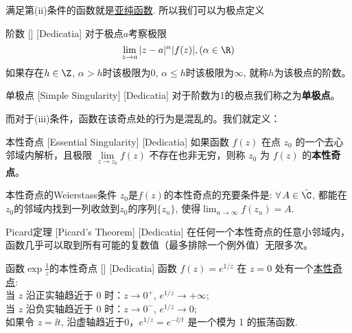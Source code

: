 \documentclass[UTF8]{ctexart}
\newcommand{\MeromorphicFunction}{\hyperref[dfn:MeromorphicFunction]{亚纯函数}}
\newcommand{\EssentialSingularity}{\hyperref[dfn:EssentialSingularity]{本性奇点}}
\begin{document}
满足第(ii)条件的函数就是\MeromorphicFunction. 所以我们可以为极点定义
\begin{dfn}
    [UUID]
    {阶数}
    []
    [Dedicatia]
    对于极点$a$考察极限
    \[\lim_{z\to a}|z-a|^\alpha |f(z)|, (\alpha\in\R)\]
    如果存在$h\in\Z$, $\alpha>h$时该极限为0, $\alpha\leq h$时该极限为$\infty$, 就称$h$为该极点的阶数。
\end{dfn}
\begin{dfn}
    [SimpleSingularity]
    {单极点}
    [Simple Singularity]
    [Dedicatia]
    对于阶数为1的极点我们称之为\textbf{单极点}。
\end{dfn}
而对于(iii)条件，函数在该奇点处的行为是混乱的。我们就定义：
\begin{dfn}
    [EssentialSingularity]
    {本性奇点}
    [Essential Singularity]
    [Dedicatia]
    如果函数 \( f(z) \) 在点 \( z_0 \) 的一个去心邻域内解析，且极限 \( \lim\limits_{z \to z_0} f(z) \) 不存在也非无穷，则称 \( z_0 \) 为 \( f(z) \) 的\textbf{本性奇点}。
\end{dfn}
\begin{thm}
    {本性奇点的Weierstass条件}
    $z_0$是$f(z)$的本性奇点的充要条件是: $\forall\,A\in\hat{\C}$, 都能在$z_0$的邻域内找到一列收敛到$z_0$的序列$\{z_n\}$, 使得$\lim_{n\to\infty}f(z_n)=A$.
\end{thm}
\begin{thm}
    [UUID]
    {Picard定理}
    [Picard's Theorem]
    [Dedicatia]
    在任何一个本性奇点的任意小邻域内，函数几乎可以取到所有可能的复数值（最多排除一个例外值）无限多次。
\end{thm}
\begin{xmp}
    [UUID]
    {函数$\exp\frac{1}{z}$的本性奇点}
    []
    [Dedicatia]
    函数 \( f(z) = e^{1/z} \) 在 \( z=0 \) 处有一个\EssentialSingularity :\\
    当 \( z \) 沿正实轴趋近于 0 时：\( z \to 0^+ \), \( e^{1/z} \to +\infty \);\\ 
    当 \( z \) 沿负实轴趋近于 0 时：\( z \to 0^- \), \( e^{1/z} \to 0 \);\\
    如果令 \( z =\ii t \), 沿虚轴趋近于0，\( e^{1/z} = e^{-\ii/t} \) 是一个模为 1 的振荡函数.
\end{xmp}
\end{document}
